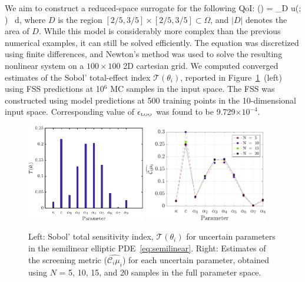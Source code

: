 We aim to construct a reduced-space surrogate for the following QoI:
\be
{}(\vec\theta) =  \int_D u(; \vec\theta) \, d, 
\label{eq:qoi}
\ee
%
where $D$ is the region $[2/5, 3/5] \times [2/5, 3/5] \subset \Omega$, 
and $|D|$ denotes the area of $D$. 
While this model is considerably more complex than the previous numerical
examples, it can still be solved efficiently.
The equation was discretized using finite differences, and Newton's method
was used to solve the resulting nonlinear system on a $100 \times 100$ 2D
cartesian grid.
We computed converged estimates of the Sobol'
total-effect index $\mathcal{T}(\theta_i)$, reported 
in Figure~\ref{fig:sense_elliptic}~(left) using FSS predictions at 10$^6$
MC samples in the input space. The FSS was 
constructed using model predictions at 500 training points in the 10-dimensional
input space. Corresponding value of $\epsilon_\text{\tiny{LOO}}$ was 
found to be 9.729$\times 10^{-4}$. 
%
\begin{figure}[htbp]
 \begin{center}
  \includegraphics[width=0.46\textwidth]{./Figures/sense_elliptic}
  \includegraphics[width=0.48\textwidth]{./Figures/ub_conv_elliptic}
\caption{
Left: Sobol' total sensitivity index, $\mathcal{T}(\theta_i)$ for uncertain parameters in the 
semilinear elliptic PDE~\eqref{eq:semilinear}. Right: 
Estimates of the screening metric ($\widehat{\mathcal{C}_i\mu_i}$) for each uncertain parameter,
obtained using $N$ = 5, 10, 15, and 20 samples in the full parameter space.}
\label{fig:sense_elliptic}
\end{center}
\end{figure}
